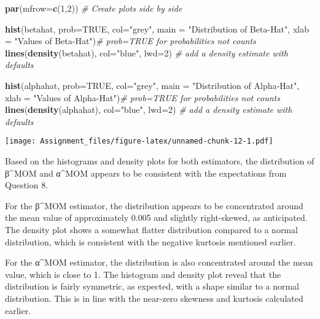 \documentclass[
]{article}
\newenvironment{Shaded}{\begin{snugshade}}{\end{snugshade}}
\newcommand{\AttributeTok}[1]{\textcolor[rgb]{0.13,0.29,0.53}{#1}}
\newcommand{\CommentTok}[1]{\textcolor[rgb]{0.56,0.35,0.01}{\textit{#1}}}
\newcommand{\ConstantTok}[1]{\textcolor[rgb]{0.56,0.35,0.01}{#1}}
\newcommand{\DecValTok}[1]{\textcolor[rgb]{0.00,0.00,0.81}{#1}}
\newcommand{\FunctionTok}[1]{\textcolor[rgb]{0.13,0.29,0.53}{\textbf{#1}}}
\newcommand{\NormalTok}[1]{#1}
\newcommand{\StringTok}[1]{\textcolor[rgb]{0.31,0.60,0.02}{#1}}
\begin{document}
\begin{Shaded}
\begin{Highlighting}[]
\FunctionTok{par}\NormalTok{(}\AttributeTok{mfrow=}\FunctionTok{c}\NormalTok{(}\DecValTok{1}\NormalTok{,}\DecValTok{2}\NormalTok{)) }\CommentTok{\# Create plots side by side}

\FunctionTok{hist}\NormalTok{(betahat, }\AttributeTok{prob=}\ConstantTok{TRUE}\NormalTok{, }\AttributeTok{col=}\StringTok{"grey"}\NormalTok{, }\AttributeTok{main =} \StringTok{"Distribution of Beta{-}Hat"}\NormalTok{, }\AttributeTok{xlab =} \StringTok{"Values of Beta{-}Hat"}\NormalTok{)}\CommentTok{\# prob=TRUE for probabilities not counts}
\FunctionTok{lines}\NormalTok{(}\FunctionTok{density}\NormalTok{(betahat), }\AttributeTok{col=}\StringTok{"blue"}\NormalTok{, }\AttributeTok{lwd=}\DecValTok{2}\NormalTok{) }\CommentTok{\# add a density estimate with defaults}


\FunctionTok{hist}\NormalTok{(alphahat, }\AttributeTok{prob=}\ConstantTok{TRUE}\NormalTok{, }\AttributeTok{col=}\StringTok{"grey"}\NormalTok{, }\AttributeTok{main =} \StringTok{"Distribution of Alpha{-}Hat"}\NormalTok{, }\AttributeTok{xlab =} \StringTok{"Values of Alpha{-}Hat"}\NormalTok{)}\CommentTok{\# prob=TRUE for probabilities not counts}
\FunctionTok{lines}\NormalTok{(}\FunctionTok{density}\NormalTok{(alphahat), }\AttributeTok{col=}\StringTok{"blue"}\NormalTok{, }\AttributeTok{lwd=}\DecValTok{2}\NormalTok{) }\CommentTok{\# add a density estimate with defaults}
\end{Highlighting}
\end{Shaded}

\texttt{[image: Assignment\_files/figure-latex/unnamed-chunk-12-1.pdf]}

Based on the histograms and density plots for both estimators, the
distribution of β\^{}MOM and α\^{}MOM appears to be consistent with the
expectations from Question 8.

For the β\^{}MOM estimator, the distribution appears to be concentrated
around the mean value of approximately 0.005 and slightly right-skewed,
as anticipated. The density plot shows a somewhat flatter distribution
compared to a normal distribution, which is consistent with the negative
kurtosis mentioned earlier.

For the α\^{}MOM estimator, the distribution is also concentrated around
the mean value, which is close to 1. The histogram and density plot
reveal that the distribution is fairly symmetric, as expected, with a
shape similar to a normal distribution. This is in line with the
near-zero skewness and kurtosis calculated earlier.
\end{document}
